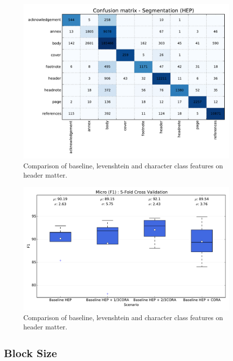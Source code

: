\begin{figure}[h]
\center
\includegraphics[width=5.5in]{Figures/baseline_confusion_segmentation.pdf}
\caption{Comparison of baseline, levenshtein and character class features on header matter.}
\label{fig:segmentation_baseline_confusion}
\end{figure}

\begin{figure}[h]
\center
\includegraphics[width=5.5in]{Figures/micro_subsampling.pdf}
\caption{Comparison of baseline, levenshtein and character class features on header matter.}
\label{fig:references} 
\end{figure}

\subsection{Block Size}

